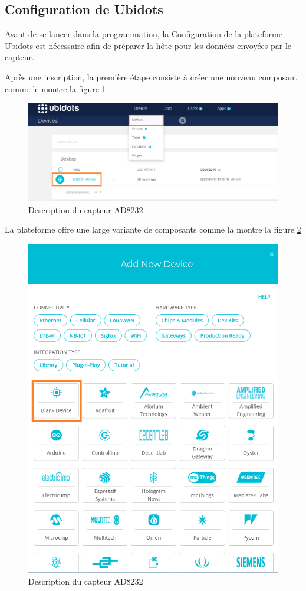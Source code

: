 \subsection{Configuration de Ubidots}
Avant de se lancer dans la programmation, la Configuration de la plateforme Ubidots est nécessaire afin de préparer la hôte pour les données envoyées par le capteur.

Après une inscription, la première étape consiste à créer une nouveau composant comme le montre la figure \ref{newdevice}.

\begin{figure}[H]
  \centering
  \includegraphics[width=\textwidth]{imgs/newdevice.png}
  \caption{Description du capteur AD8232 \label{newdevice}}
\end{figure}

La plateforme offre une large variante de composants comme la montre la figure \ref{devices}

\begin{figure}[H]
  \centering
  \includegraphics[scale=.4]{imgs/devices.png}
  \caption{Description du capteur AD8232 \label{devices}}
\end{figure}


